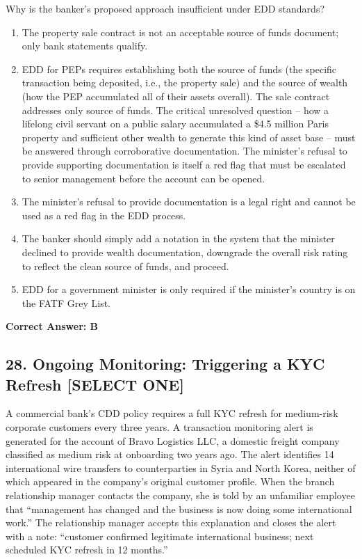 \documentclass[11pt,a4paper]{article}
\begin{document}
	Why is the banker's proposed approach insufficient under EDD standards?
	
	\begin{enumerate}[label=\Alph*.]
		\item The property sale contract is not an acceptable source of funds document; only bank statements qualify.
		\item EDD for PEPs requires establishing both the source of funds (the specific transaction being deposited, i.e., the property sale) and the source of wealth (how the PEP accumulated all of their assets overall). The sale contract addresses only source of funds. The critical unresolved question -- how a lifelong civil servant on a public salary accumulated a \$4.5 million Paris property and sufficient other wealth to generate this kind of asset base -- must be answered through corroborative documentation. The minister's refusal to provide supporting documentation is itself a red flag that must be escalated to senior management before the account can be opened.
		\item The minister's refusal to provide documentation is a legal right and cannot be used as a red flag in the EDD process.
		\item The banker should simply add a notation in the system that the minister declined to provide wealth documentation, downgrade the overall risk rating to reflect the clean source of funds, and proceed.
		\item EDD for a government minister is only required if the minister's country is on the FATF Grey List.
	\end{enumerate}
	\textbf{Correct Answer: B}
	
	\subsection{28. Ongoing Monitoring: Triggering a KYC Refresh \textnormal{[SELECT ONE]}}
	
	A commercial bank's CDD policy requires a full KYC refresh for medium-risk corporate customers every three years. A transaction monitoring alert is generated for the account of Bravo Logistics LLC, a domestic freight company classified as medium risk at onboarding two years ago. The alert identifies 14 international wire transfers to counterparties in Syria and North Korea, neither of which appeared in the company's original customer profile. When the branch relationship manager contacts the company, she is told by an unfamiliar employee that ``management has changed and the business is now doing some international work.'' The relationship manager accepts this explanation and closes the alert with a note: ``customer confirmed legitimate international business; next scheduled KYC refresh in 12 months.''
	
\end{document}
